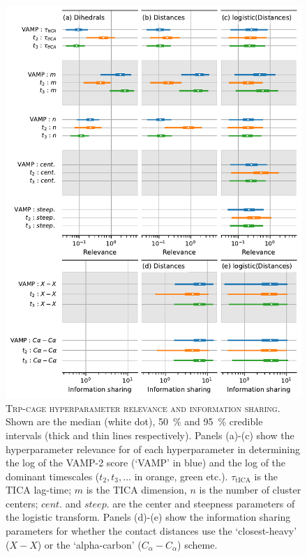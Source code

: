 \documentclass{article}
\begin{document}
\begin{figure}[h]
    \centering
    \includegraphics[height=0.8\textheight]{figures/sensitivities/2jof_sensitivity.pdf}
    \caption{\textsc{Trp-cage hyperparameter relevance and information sharing}. Shown are the  median (white dot), \SI{50}{\percent} and \SI{95}{\percent} credible intervals (thick and thin lines respectively).  Panels (a)-(c) show the hyperparameter relevance for of each hyperparameter in determining the log of the VAMP-2 score (`VAMP' in blue) and the log of the dominant timescales ($t_{2}, t_{3}, ...$ in orange, green etc.). $\tau_{\mathrm{tICA}}$ is the TICA lag-time; $m$ is the TICA dimension, $n$ is the number of cluster centers; $cent.$ and $steep.$ are the center and steepness parameters of the logistic transform. Panels (d)-(e) show the information sharing parameters for whether the contact distances use the `closest-heavy' ($X-X$) or the `alpha-carbon' ($C_{\alpha}-C_{\alpha}$) scheme.  }
    \label{fig:2jof_sense}
\end{figure}
\end{document}
